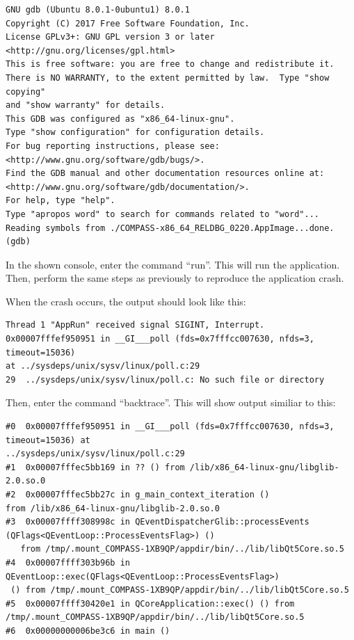 \begin{verbatim}
GNU gdb (Ubuntu 8.0.1-0ubuntu1) 8.0.1
Copyright (C) 2017 Free Software Foundation, Inc.
License GPLv3+: GNU GPL version 3 or later <http://gnu.org/licenses/gpl.html>
This is free software: you are free to change and redistribute it.
There is NO WARRANTY, to the extent permitted by law.  Type "show copying"
and "show warranty" for details.
This GDB was configured as "x86_64-linux-gnu".
Type "show configuration" for configuration details.
For bug reporting instructions, please see:
<http://www.gnu.org/software/gdb/bugs/>.
Find the GDB manual and other documentation resources online at:
<http://www.gnu.org/software/gdb/documentation/>.
For help, type "help".
Type "apropos word" to search for commands related to "word"...
Reading symbols from ./COMPASS-x86_64_RELDBG_0220.AppImage...done.
(gdb) 
\end{verbatim}


In the shown console, enter the command ``run''. This will run the application. Then, perform the same steps as previously to reproduce the application crash.

When the crash occurs, the output should look like this:

\begin{verbatim}
Thread 1 "AppRun" received signal SIGINT, Interrupt.
0x00007fffef950951 in __GI___poll (fds=0x7fffcc007630, nfds=3, timeout=15036) 
at ../sysdeps/unix/sysv/linux/poll.c:29
29	../sysdeps/unix/sysv/linux/poll.c: No such file or directory
\end{verbatim}

Then, enter the command ``backtrace''. This will show output similiar to this:

\begin{verbatim}
#0  0x00007fffef950951 in __GI___poll (fds=0x7fffcc007630, nfds=3, timeout=15036) at 
../sysdeps/unix/sysv/linux/poll.c:29
#1  0x00007fffec5bb169 in ?? () from /lib/x86_64-linux-gnu/libglib-2.0.so.0
#2  0x00007fffec5bb27c in g_main_context_iteration () 
from /lib/x86_64-linux-gnu/libglib-2.0.so.0
#3  0x00007ffff308998c in QEventDispatcherGlib::processEvents
(QFlags<QEventLoop::ProcessEventsFlag>) ()
   from /tmp/.mount_COMPASS-1XB9QP/appdir/bin/../lib/libQt5Core.so.5
#4  0x00007ffff303b96b in QEventLoop::exec(QFlags<QEventLoop::ProcessEventsFlag>)
 () from /tmp/.mount_COMPASS-1XB9QP/appdir/bin/../lib/libQt5Core.so.5
#5  0x00007ffff30420e1 in QCoreApplication::exec() () from 
/tmp/.mount_COMPASS-1XB9QP/appdir/bin/../lib/libQt5Core.so.5
#6  0x00000000006be3c6 in main ()
\end{verbatim}

